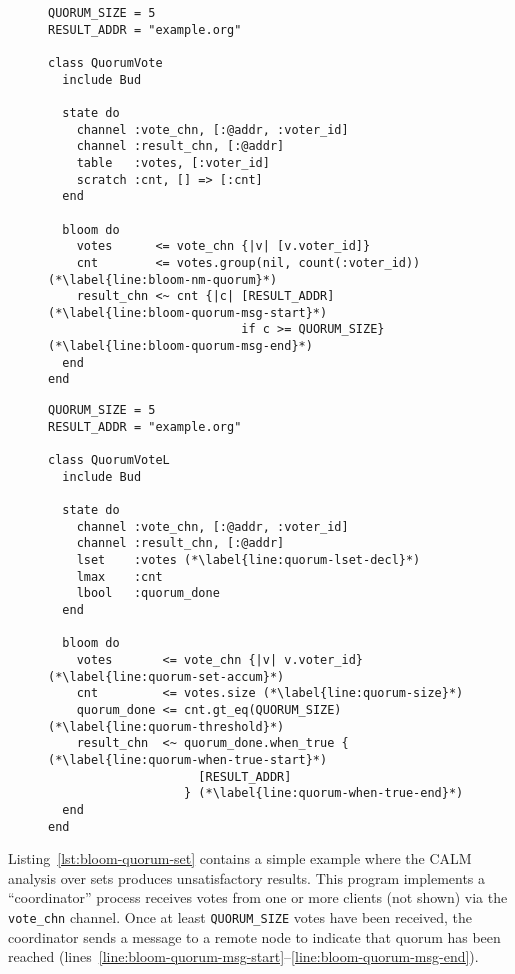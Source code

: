 \begin{figure}[t]
\begin{minipage}{.48\textwidth}
\begin{lstlisting}[caption=Quorum vote in Bloom (non-monotonic).,label=lst:bloom-quorum-set]
QUORUM_SIZE = 5
RESULT_ADDR = "example.org"

class QuorumVote
  include Bud

  state do
    channel :vote_chn, [:@addr, :voter_id]
    channel :result_chn, [:@addr]
    table   :votes, [:voter_id]
    scratch :cnt, [] => [:cnt]
  end

  bloom do
    votes      <= vote_chn {|v| [v.voter_id]}
    cnt        <= votes.group(nil, count(:voter_id)) (*\label{line:bloom-nm-quorum}*)
    result_chn <~ cnt {|c| [RESULT_ADDR] (*\label{line:bloom-quorum-msg-start}*)
                           if c >= QUORUM_SIZE} (*\label{line:bloom-quorum-msg-end}*)
  end
end
\end{lstlisting}
\end{minipage}
\begin{minipage}{.48\textwidth}
\begin{lstlisting}[caption=Quorum vote in \blooml (monotonic).,label=lst:bloom-quorum-lattice]
QUORUM_SIZE = 5
RESULT_ADDR = "example.org"

class QuorumVoteL
  include Bud

  state do
    channel :vote_chn, [:@addr, :voter_id]
    channel :result_chn, [:@addr]
    lset    :votes (*\label{line:quorum-lset-decl}*)
    lmax    :cnt
    lbool   :quorum_done
  end

  bloom do
    votes       <= vote_chn {|v| v.voter_id} (*\label{line:quorum-set-accum}*)
    cnt         <= votes.size (*\label{line:quorum-size}*)
    quorum_done <= cnt.gt_eq(QUORUM_SIZE) (*\label{line:quorum-threshold}*)
    result_chn  <~ quorum_done.when_true { (*\label{line:quorum-when-true-start}*)
                     [RESULT_ADDR]
                   } (*\label{line:quorum-when-true-end}*)
  end
end
\end{lstlisting}
\end{minipage}
\end{figure}

Listing~\ref{lst:bloom-quorum-set} contains a simple example where the CALM
analysis over sets produces unsatisfactory results. This program implements a
``coordinator'' process receives votes from one or more clients (not shown) via
the \texttt{vote\_chn} channel. Once at least \texttt{QUORUM\_SIZE} votes have
been received, the coordinator sends a message to a remote node to indicate that
quorum has been reached
(lines~\ref{line:bloom-quorum-msg-start}--\ref{line:bloom-quorum-msg-end}).

